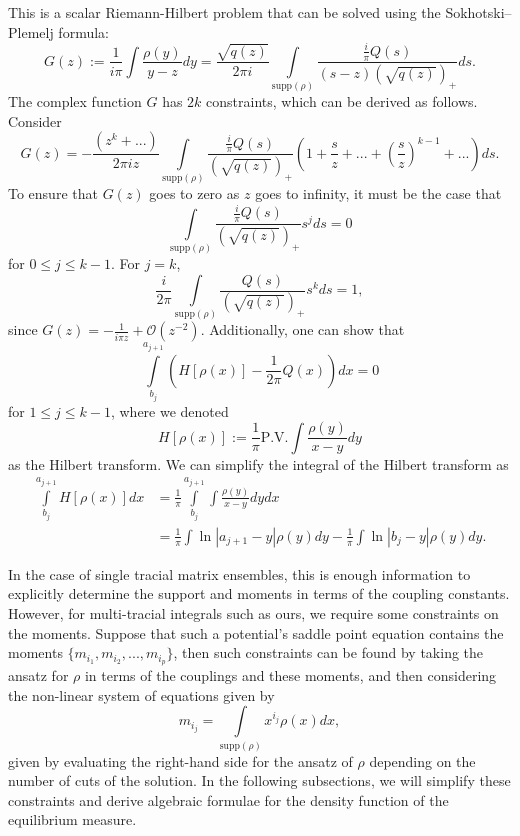 \documentclass[10pt]{article}
\theoremstyle{plain}
\theoremstyle{definition}
\theoremstyle{plain}
\begin{document}
 This is a scalar Riemann-Hilbert problem that can be solved using the Sokhotski–Plemelj formula: 
 \begin{equation*}
 G(z) :=\frac{1}{i \pi} \int\frac{\rho(y)}{y-z}dy = \frac{\sqrt{q(z)}}{2 \pi i}\int \limits_{\text{supp}(\rho)} \frac{\frac{i}{\pi}Q(s)}{(s-z)(\sqrt{q(z)})_{+}}ds.
 \end{equation*}
The complex function $G$ has $2k$ constraints, which can be derived as follows. Consider 
\begin{equation*}
 G(z) = -\frac{(z^{k} + ...)}{2 \pi iz}\int\limits_{\text{supp}(\rho)} \frac{\frac{i}{\pi}Q(s)}{(\sqrt{q(z)})_{+}}\left(1+\frac{s}{z} +...+\left(\frac{s}{z}\right)^{k-1} +... \right)ds.
\end{equation*}
To ensure that $G(z)$ goes to zero as $z$ goes to infinity, it must be the case that 
\begin{equation}
 \int\limits_{\text{supp}(\rho)} \frac{\frac{i}{\pi}Q(s)}{(\sqrt{q(z)})_{+}}s^{j}ds =0
\end{equation}
for $0\leq j \leq k-1$.
For $j=k$, 
\begin{equation}
 \frac{i}{2 \pi}\int\limits_{\text{supp}(\rho)} \frac{Q(s)}{(\sqrt{q(z)})_{+}}s^{k}ds =1,
\end{equation}
since $G(z) = -\frac{1}{i \pi z} + \mathcal{O}(z^{-2})$.
Additionally, one can show that 
\begin{equation}
 \int\limits_{b_{j}}^{a_{j+1}}\left(H [\rho(x)] - \frac{1}{2\pi } Q(x) \right) dx = 0 
\end{equation}
for $1 \leq j \leq k-1$, where we denoted 
\begin{equation*}
 H [\rho(x)]:= \frac{1}{\pi}\text{P.V.} \int\frac{\rho(y)}{x-y}dy
\end{equation*}
as the Hilbert transform. We can simplify the integral of the Hilbert transform as 
\begin{align*}
 \int\limits_{b_{j}}^{a_{j+1}} H[\rho(x)]dx &=\frac{1}{\pi}\int\limits_{b_{j}}^{a_{j+1}} \int\frac{\rho(y)}{x-y}dy dx\\
 &=\frac{1}{\pi} \int \ln|a_{j+1}-y|\rho(y) dy - \frac{1}{\pi}\int \ln|b_{j}-y|\rho(y) dy.
\end{align*}

In the case of single tracial matrix ensembles, this is enough information to explicitly determine the support and moments in terms of the coupling constants. However, for multi-tracial integrals such as ours, we require some constraints on the moments. Suppose that such a potential's saddle point equation contains the moments $\{m_{i_{1}},m_{i_{2}},...,m_{i_{p}}\}$, then such constraints can be found by taking the ansatz for $\rho$ in terms of the couplings and these moments, and then considering the non-linear system of equations given by 
$$m_{i_{j}} = \int\limits_{\text{supp}(\rho)}x^{i_{j}}\rho(x)dx,$$ 
given by evaluating the right-hand side for the ansatz of $\rho$ depending on the number of cuts of the solution. In the following subsections, we will simplify these constraints and derive algebraic formulae for the density function of the equilibrium measure.
\end{document}
